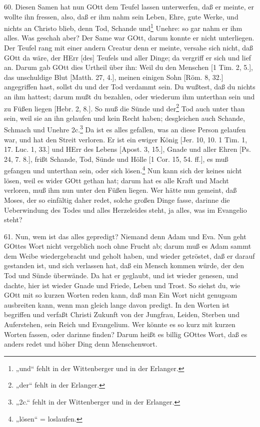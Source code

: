 60. Diesen Samen hat nun GOtt dem Teufel lassen unterwerfen, daß er meinte, er wollte ihn fressen, also, daß er ihm nahm sein Leben, Ehre, gute Werke, und nichts an Christo blieb, denn Tod, Schande und\footnote{„und“ fehlt in der Wittenberger und in der Erlanger.} Unehre: so gar nahm er ihm alles. Was geschah aber? Der Same war GOtt, darum konnte er nicht unterliegen. Der Teufel rang mit einer andern Creatur denn er meinte, versahe sich nicht, daß GOtt da wäre, der HErr [des] Teufels und aller Dinge; da vergriff er sich und lief an. Darum gab GOtt dies Urtheil über ihn: Weil du den Menschen [1 Tim. 2, 5.], das unschuldige Blut [Matth. 27, 4.], meinen einigen Sohn [Röm. 8, 32.] angegriffen hast, sollst du und der Tod verdammt sein. Du wußtest, daß du nichts an ihm hattest; darum mußt du bezahlen, oder wiederum ihm unterthan sein und zu Füßen liegen [Hebr. 2, 8.]. So muß die Sünde und der\footnote{„der“ fehlt in der Erlanger.} Tod auch unter
than sein, weil sie an ihn gelaufen und kein Recht haben; desgleichen auch Schande, Schmach und Unehre 2c.\footnote{„2c.“ fehlt in der Wittenberger und in der Erlanger.} Da ist es alles gefallen, was an diese Person gelaufen war, und hat den Streit verloren. Er ist ein ewiger König [Jer. 10, 10. 1 Tim. 1, 17. Luc. 1, 33.] und HErr des Lebens [Apost. 3, 15.], Gnade und aller Ehren [Ps. 24, 7. 8.], frißt Schande, Tod, Sünde und Hölle [1 Cor. 15, 54. ff.], es muß gefangen und unterthan sein, oder sich lösen.\footnote{„lösen“ = loslaufen.} Nun kann sich der keines nicht lösen, weil es wider GOtt gethan hat; darum hat es alle Kraft und Macht verloren, muß ihm nun unter den Füßen liegen. Wer hätte nun gemeint, daß Moses, der so einfältig daher redet, solche großen Dinge fasse, darinne die Ueberwindung des Todes und alles Herzeleides steht, ja alles, was im Evangelio steht?

61. Nun, wem ist das alles gepredigt? Niemand denn Adam und Eva. Nun geht GOttes Wort nicht vergeblich noch ohne Frucht ab; darum muß es Adam sammt dem Weibe wiedergebracht und geholt haben, und wieder getröstet, daß er darauf gestanden ist, und sich verlassen hat, daß ein Mensch kommen würde, der den Tod und Sünde überwände. Da hat er geglaubt, und ist wieder genesen, und dachte, hier ist wieder Gnade und Friede, Leben und Trost. So siehst du, wie GOtt mit so kurzen Worten reden kann, daß man Ein Wort nicht genugsam ausbreiten kann, wenn man gleich lange davon predigt. In den Worten ist begriffen und verfaßt Christi Zukunft von der Jungfrau, Leiden, Sterben und Auferstehen, sein Reich und Evangelium. Wer könnte es so kurz mit kurzen Worten fassen, oder darinne finden? Darum heißt es billig GOttes Wort, daß es anders redet und höher Ding denn Menschenwort.


